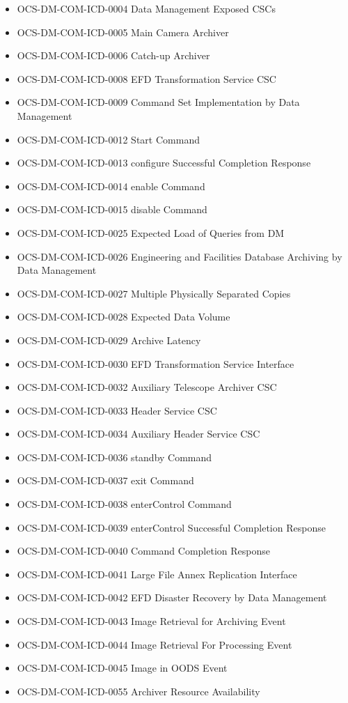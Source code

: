 \begin{itemize}
\item OCS-DM-COM-ICD-0004 Data Management Exposed CSCs
\item OCS-DM-COM-ICD-0005 Main Camera Archiver
\item OCS-DM-COM-ICD-0006 Catch-up Archiver
\item OCS-DM-COM-ICD-0008 EFD Transformation Service CSC
\item OCS-DM-COM-ICD-0009 Command Set Implementation by Data Management
\item OCS-DM-COM-ICD-0012 Start Command
\item OCS-DM-COM-ICD-0013 configure Successful Completion Response
\item OCS-DM-COM-ICD-0014 enable Command
\item OCS-DM-COM-ICD-0015 disable Command
\item OCS-DM-COM-ICD-0025 Expected Load of Queries from DM
\item OCS-DM-COM-ICD-0026 Engineering and Facilities Database Archiving by Data Management
\item OCS-DM-COM-ICD-0027 Multiple Physically Separated Copies
\item OCS-DM-COM-ICD-0028 Expected Data Volume
\item OCS-DM-COM-ICD-0029 Archive Latency
\item OCS-DM-COM-ICD-0030 EFD Transformation Service Interface
\item OCS-DM-COM-ICD-0032 Auxiliary Telescope Archiver CSC
\item OCS-DM-COM-ICD-0033 Header Service CSC
\item OCS-DM-COM-ICD-0034 Auxiliary Header Service CSC
\item OCS-DM-COM-ICD-0036 standby Command
\item OCS-DM-COM-ICD-0037 exit Command
\item OCS-DM-COM-ICD-0038 enterControl Command
\item OCS-DM-COM-ICD-0039 enterControl Successful Completion Response
\item OCS-DM-COM-ICD-0040 Command Completion Response
\item OCS-DM-COM-ICD-0041 Large File Annex Replication Interface
\item OCS-DM-COM-ICD-0042 EFD Disaster Recovery by Data Management
\item OCS-DM-COM-ICD-0043 Image Retrieval for Archiving Event
\item OCS-DM-COM-ICD-0044 Image Retrieval For Processing Event
\item OCS-DM-COM-ICD-0045 Image in OODS Event
\item OCS-DM-COM-ICD-0055 Archiver Resource Availability
\end{itemize}
